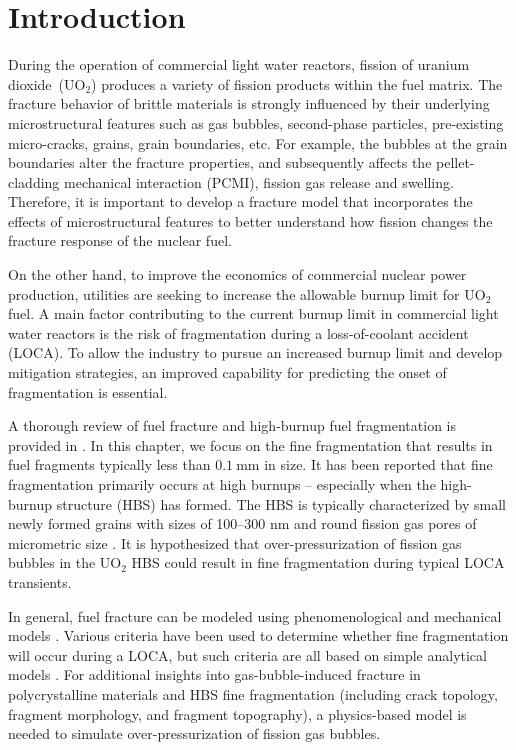 \section{Introduction}
\label{section: brittle/intro}

During the operation of commercial light water reactors, fission of uranium dioxide~(UO$_2$) produces a variety of fission products within the fuel matrix. The fracture behavior of brittle materials is strongly influenced by their underlying microstructural features such as gas bubbles, second-phase particles, pre-existing micro-cracks, grains, grain boundaries, etc. For example, the bubbles at the grain boundaries alter the fracture properties, and subsequently affects the pellet-cladding mechanical interaction (PCMI), fission gas release and swelling. Therefore, it is important to develop a fracture model that incorporates the effects of microstructural features to better understand how fission changes the fracture response of the nuclear fuel.

On the other hand, to improve the economics of commercial nuclear power production, utilities are seeking to increase the allowable burnup limit for UO$_2$ fuel. A main factor contributing to the current burnup limit in commercial light water reactors is the risk of fragmentation during a loss-of-coolant accident (LOCA). To allow the industry to pursue an increased burnup limit and develop mitigation strategies, an improved capability for predicting the onset of fragmentation is essential.

A thorough review of fuel fracture and high-burnup fuel fragmentation is provided in \cite{CAPPS2021152750}. In this chapter, we focus on the fine fragmentation that results in fuel fragments typically less than $\SI{0.1}{\milli\meter}$ in size. It has been reported that fine fragmentation primarily occurs at high burnups -- especially when the high-burnup structure (HBS) has formed. The HBS is typically characterized by small newly formed grains with sizes of 100--300 nm and round fission gas pores of micrometric size \cite{RONDINELLA201024}. It is hypothesized that over-pressurization of fission gas bubbles in the UO$_2$ HBS could result in fine fragmentation during typical LOCA transients.

In general, fuel fracture can be modeled using phenomenological \cite{Turnbull2015} and mechanical models \cite{JIANG2020106713}. Various criteria have been used to determine whether fine fragmentation will occur during a LOCA, but such criteria are all based on simple analytical models \cite{KULACSY2015409, JERNKVIST2020103188}. For additional insights into gas-bubble-induced fracture in polycrystalline materials and HBS fine fragmentation (including crack topology, fragment morphology, and fragment topography), a physics-based model is needed to simulate over-pressurization of fission gas bubbles.

